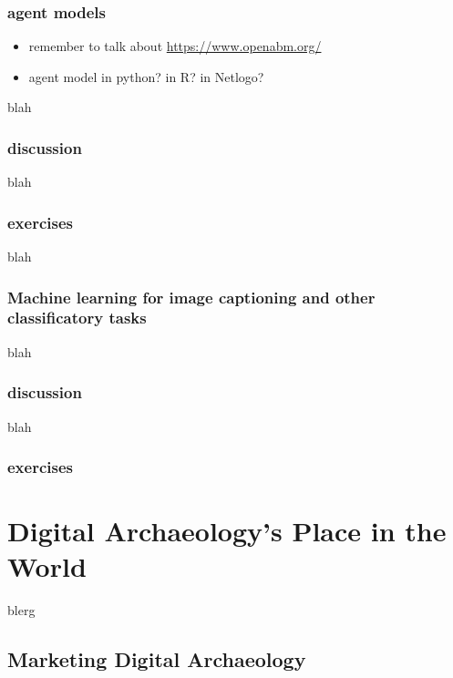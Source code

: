 \documentclass[english,]{book}
\providecommand{\tightlist}{%
  \setlength{\itemsep}{0pt}\setlength{\parskip}{0pt}}
\begin{document}
\subsection{agent models}\label{agent-models}

\begin{itemize}
\tightlist
\item
  remember to talk about \url{https://www.openabm.org/}
\item
  agent model in python? in R? in Netlogo?
\end{itemize}

blah

\subsection{discussion}\label{discussion-13}

blah

\subsection{exercises}\label{exercises-18}

blah

\subsection{Machine learning for image captioning and other
classificatory
tasks}\label{machine-learning-for-image-captioning-and-other-classificatory-tasks}

blah

\subsection{discussion}\label{discussion-14}

blah

\subsection{exercises}\label{exercises-19}

\chapter{Digital Archaeology's Place in the
World}\label{digital-archaeologys-place-in-the-world}

blerg

\section{Marketing Digital
Archaeology}\label{marketing-digital-archaeology}
\end{document}
